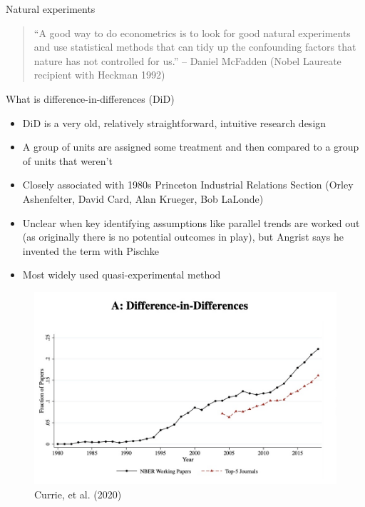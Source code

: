 \documentclass{beamer}
\begin{document}
\begin{frame}{Natural experiments}

\begin{quote}
``A good way to do econometrics is to look for good natural experiments and use statistical methods that can tidy up the confounding factors that nature has not controlled for us.'' -- Daniel McFadden (Nobel Laureate recipient with Heckman 1992)
\end{quote}

\end{frame}




\begin{frame}{What is difference-in-differences (DiD)}

\begin{itemize}
\item DiD is a very old, relatively straightforward, intuitive research design
\item A group of units are assigned some treatment and then compared to a group of units that weren't
\item Closely associated with 1980s Princeton Industrial Relations Section (Orley Ashenfelter, David Card, Alan Krueger, Bob LaLonde)
\item Unclear when key identifying assumptions like parallel trends are worked out (as originally there is no potential outcomes in play), but Angrist says he invented the term with Pischke
\item Most widely used quasi-experimental method
\end{itemize}

\end{frame}


\begin{frame}

	\begin{figure}
	\caption{Currie, et al. (2020)}
	\includegraphics[scale=0.25]{./lecture_includes/currie_did.png}
	\end{figure}


\end{frame}
\end{document}

